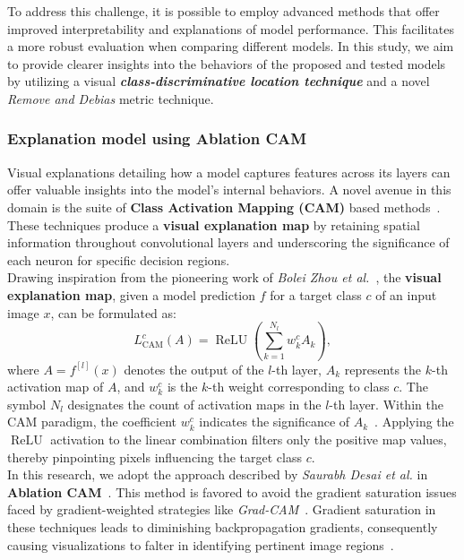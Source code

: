 To address this challenge, it is possible to employ advanced methods that offer improved interpretability and explanations of model performance. This facilitates a more robust evaluation when comparing different models. In this study, we aim to provide clearer insights into the behaviors of the proposed and tested models by utilizing a visual \textbf{\textit{class-discriminative location technique}} and a novel \textit{Remove and Debias} metric technique.

\subsubsection{Explanation model using Ablation CAM}
Visual explanations detailing how a model captures features across its layers can offer valuable insights into the model's internal behaviors. A novel avenue in this domain is the suite of \textbf{Class Activation Mapping (CAM)} based methods~\cite{DBLP:journals/corr/ZhouKLOT15, DBLP:journals/corr/SelvarajuDVCPB16, DBLP:journals/corr/abs-1710-11063, DBLP:journals/corr/abs-2008-02312, DBLP:journals/corr/abs-1910-01279, 9093360}. These techniques produce a \textbf{visual explanation map} by retaining spatial information throughout convolutional layers and underscoring the significance of each neuron for specific decision regions.\\

Drawing inspiration from the pioneering work of \textit{Bolei Zhou et al.}~\cite{DBLP:journals/corr/ZhouKLOT15}, the \textbf{visual explanation map}, given a model prediction \(f\) for a target class \(c\) of an input image \(x\), can be formulated as:
\begin{equation}
L_{\mathrm{CAM}}^c(A)=\operatorname{ReLU}\left(\sum_{k=1}^{N_l} w_{k}^{c} A_k\right), \label{eq:cam}
\end{equation}
where \(A = f^{[l]}(x)\) denotes the output of the \(l\)-th layer, \(A_k\) represents the \(k\)-th activation map of \(A\), and \(w_{k}^{c}\) is the \(k\)-th weight corresponding to class \(c\). The symbol \(N_l\) designates the count of activation maps in the \(l\)-th layer. Within the CAM paradigm, the coefficient \(w_{k}^{c}\) indicates the significance of \(A_k\)~\cite{DBLP:journals/corr/ZhouKLOT15}. Applying the \(\operatorname{ReLU}\) activation to the linear combination filters only the positive map values, thereby pinpointing pixels influencing the target class \(c\).\\

In this research, we adopt the approach described by \textit{Saurabh Desai et al.} in \textbf{Ablation CAM}~\cite{9093360}. This method is favored to avoid the gradient saturation issues faced by gradient-weighted strategies like \textit{Grad-CAM}~\cite{DBLP:journals/corr/SelvarajuDVCPB16}. Gradient saturation in these techniques leads to diminishing backpropagation gradients, consequently causing visualizations to falter in identifying pertinent image regions~\cite{9093360, DBLP:journals/corr/abs-2008-02312}.\\

